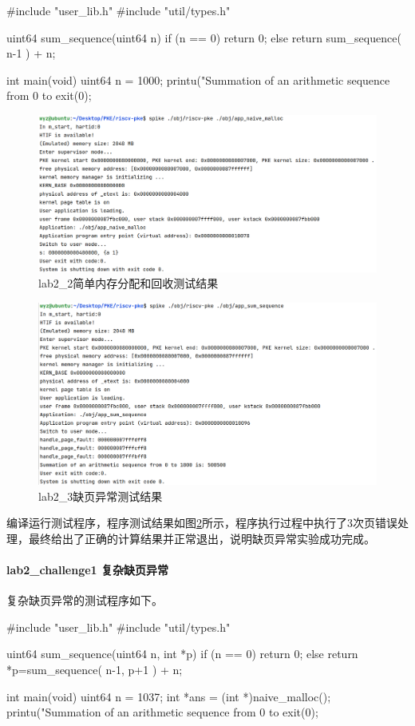 \begin{cppcode}
#include "user_lib.h"
#include "util/types.h"

uint64 sum_sequence(uint64 n) {
  if (n == 0)
    return 0;
  else
    return sum_sequence( n-1 ) + n;
}

int main(void) {
  uint64 n = 1000;
  printu("Summation of an arithmetic sequence from 0 to %
  exit(0);
}
\end{cppcode}
\begin{figure}[!htbp]
    \centering
    \includegraphics[width = 13cm]{figure/lab2_2_testresult.png}
    \caption{lab2_2简单内存分配和回收测试结果}
    \label{fig:lab2-2-testres}
\end{figure}
\begin{figure}[!htbp]
    \centering
    \includegraphics[width = 13cm]{figure/lab2_3_testresult.png}
    \caption{lab2_3缺页异常测试结果}
    \label{fig:lab2-3-testres}
\end{figure}

编译运行测试程序，程序测试结果如图\ref{fig:lab2-3-testres}所示，程序执行过程中执行了3次页错误处理，最终给出了正确的计算结果并正常退出，说明缺页异常实验成功完成。

\paragraph{lab2_challenge1 复杂缺页异常}
复杂缺页异常的测试程序如下。
\begin{cppcode}
#include "user_lib.h"
#include "util/types.h"

uint64 sum_sequence(uint64 n, int *p) {
  if (n == 0)
    return 0;
  else
    return *p=sum_sequence( n-1, p+1 ) + n;
}

int main(void) {
  uint64 n = 1037;
  int *ans = (int *)naive_malloc();
  printu("Summation of an arithmetic sequence from 0 to %
  exit(0);
}
\end{cppcode}

